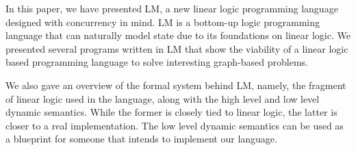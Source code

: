 In this paper, we have presented LM, a new linear logic programming language designed with concurrency in mind. LM is a bottom-up logic programming language
that can naturally model state due to its foundations on linear logic.
We presented several programs written in LM that show the viability of a linear logic based programming language to solve interesting graph-based problems.

We also gave an overview of the formal system behind LM, namely, the fragment of linear logic used in the language, along with the high level and low level dynamic semantics.
While the former is closely tied to linear logic, the latter is closer to a real implementation. The low level dynamic semantics can be used as a blueprint for someone that
intends to implement our language.

